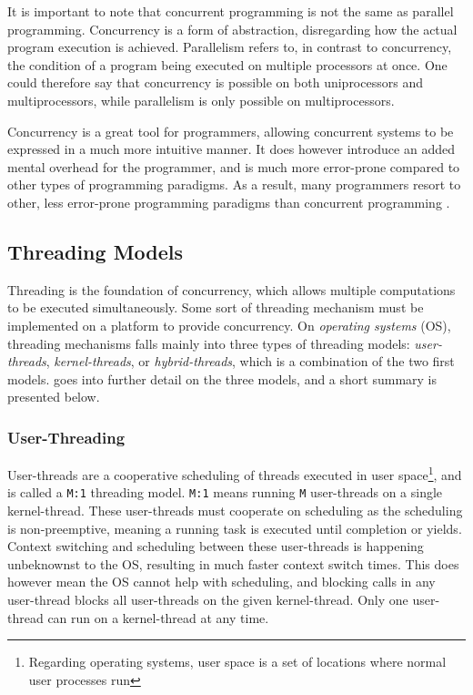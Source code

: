It is important to note that concurrent programming is not the same as parallel programming. Concurrency is a form of abstraction, disregarding how the actual program execution is achieved. Parallelism refers to, in contrast to concurrency, the condition of a program being executed on multiple processors at once. One could therefore say that concurrency is possible on both uniprocessors and multiprocessors, while parallelism is only possible on multiprocessors.

Concurrency is a great tool for programmers, allowing concurrent systems to be expressed in a much more intuitive manner. It does however introduce an added mental overhead for the programmer, and is much more error\hyp{}prone compared to other types of programming paradigms. As a result, many programmers resort to other, less error\hyp{}prone programming paradigms than concurrent programming \citep{mordechai2006principles}.


\subsection{Threading Models}
\label{subsec:threading_models}


Threading is the foundation of concurrency, which allows multiple computations to be executed simultaneously. Some sort of threading mechanism must be implemented on a platform to provide concurrency. On \textit{operating systems} (OS), threading mechanisms falls mainly into three types of threading models: \textit{user\hyp{}threads}, \textit{kernel\hyp{}threads}, or \textit{hybrid\hyp{}threads}, which is a combination of the two first models. \citet{c++csp2} goes into further detail on the three models, and a short summary is presented below.


\subsubsection{User\hyp{}Threading}


User\hyp{}threads are a cooperative scheduling of threads executed in user space\footnote{Regarding operating systems, user space is a set of locations where normal user processes run}, and is called a \texttt{M:1} threading model. \texttt{M:1} means running \texttt{M} user\hyp{}threads on a single kernel\hyp{}thread. These user\hyp{}threads must cooperate on scheduling as the scheduling is non\hyp{}preemptive, meaning a running task is executed until completion or yields. Context switching and scheduling between these user\hyp{}threads is happening unbeknownst to the OS, resulting in much faster context switch times. This does however mean the OS cannot help with scheduling, and blocking calls in any user\hyp{}thread blocks all user\hyp{}threads on the given kernel\hyp{}thread. Only one user\hyp{}thread can run on a kernel\hyp{}thread at any time.


